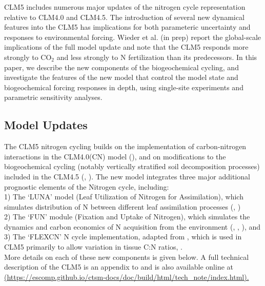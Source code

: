 \documentclass[draft,linenumbers]{agujournal}
\begin{document}
CLM5 includes numerous major updates of the nitrogen cycle representation relative to CLM4.0 and CLM4.5. The introduction of several new dynamical features into the CLM5 has implications for both parameteric uncertainty and responses to environmental forcing. Wieder et al. (in prep) report the global-scale implications of the full model update and note that the CLM5 responds more strongly to CO$_{2}$ and less strongly to N fertilization than its predecessors.  In this paper, we describe the new components of the biogeochemical cycling, and investigate the features of the new model that control the model state and biogeochemical forcing responses in depth, using single-site experiments and parametric sensitivity analyses. 

\subsection{Model Updates}

The CLM5 nitrogen cycling builds on the implementation of carbon-nitrogen interactions in the CLM4.0(CN) model (\cite{thornton2007}), and on modifications to the biogeochemical cycling (notably vertically stratified soil decomposition processes) included in the CLM4.5 (\cite{koven2013}, \cite{bonan2012}). The new model integrates three major additional prognostic elements of the Nitrogen cycle, including: \\

1) The `LUNA' model (Leaf Utilization of Nitrogen for Assimilation), which simulates distribution of N between different leaf assimilation processes (\cite{xu2012}, \cite{ali2016}) \\

2) The `FUN' module (Fixation and Uptake of Nitrogen), which simulates the dynamics and carbon economics of N acquisition from the environment (\cite{fisher2010fun}, \cite{brzostek2014}, \cite{shi2016}), and\\

3) The `FLEXCN' N cycle implementation, adapted from \cite{ghimire2016}, which is used in CLM5 primarily to allow variation in tissue C:N ratios,  .\\

More details on each of these new components is given below. A full technical description of the CLM5 is an appendix to \cite{lawrence2018} and is also available online at \url{(https://escomp.github.io/ctsm-docs/doc/build/html/tech_note/index.html).}
\end{document}
